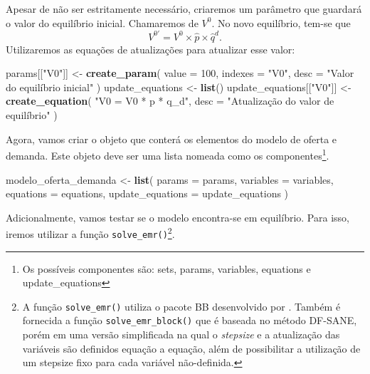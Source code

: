 \documentclass[12pt,twoside]{article}
\newenvironment{Shaded}{\begin{snugshade}}{\end{snugshade}}
\newcommand{\DataTypeTok}[1]{\textcolor[rgb]{0.13,0.29,0.53}{#1}}
\newcommand{\DecValTok}[1]{\textcolor[rgb]{0.00,0.00,0.81}{#1}}
\newcommand{\KeywordTok}[1]{\textcolor[rgb]{0.13,0.29,0.53}{\textbf{#1}}}
\newcommand{\NormalTok}[1]{#1}
\newcommand{\StringTok}[1]{\textcolor[rgb]{0.31,0.60,0.02}{#1}}
\let\oldShaded\Shaded
\let\endoldShaded\endShaded
\renewenvironment{Shaded}{\footnotesize\oldShaded}{\endoldShaded}
\let\rmarkdownfootnote\footnote%
\def\footnote{\protect\rmarkdownfootnote}
\begin{document}
Apesar de não ser estritamente necessário, criaremos um parâmetro que
guardará o valor do equilíbrio inicial. Chamaremos de \(V^0\). No novo
equilíbrio, tem-se que
\[V^{0\prime} = V^0 \times \hat{p} \times \hat{q}^d.\] Utilizaremos as
equações de atualizações para atualizar esse valor:

\begin{Shaded}
\begin{Highlighting}[]
\NormalTok{params[[}\StringTok{"V0"}\NormalTok{]] <-}\StringTok{ }\KeywordTok{create_param}\NormalTok{(}
  \DataTypeTok{value =} \DecValTok{100}\NormalTok{,}
  \DataTypeTok{indexes =} \StringTok{"V0"}\NormalTok{,}
  \DataTypeTok{desc =} \StringTok{"Valor do equilíbrio inicial"}
\NormalTok{)}
\NormalTok{update_equations <-}\StringTok{ }\KeywordTok{list}\NormalTok{()}
\NormalTok{update_equations[[}\StringTok{"V0"}\NormalTok{]] <-}\StringTok{ }\KeywordTok{create_equation}\NormalTok{(}
  \StringTok{"V0 = V0 * p * q_d"}\NormalTok{,}
  \DataTypeTok{desc =} \StringTok{"Atualização do valor de equilíbrio"}
\NormalTok{)}
\end{Highlighting}
\end{Shaded}

Agora, vamos criar o objeto que conterá os elementos do modelo de oferta
e demanda. Este objeto deve ser uma lista nomeada como os
componentes\footnote{Os possíveis componentes são: sets, params,
  variables, equations e update\_equations}.

\begin{Shaded}
\begin{Highlighting}[]
\NormalTok{modelo_oferta_demanda <-}\StringTok{ }\KeywordTok{list}\NormalTok{(}
  \DataTypeTok{params =}\NormalTok{ params,}
  \DataTypeTok{variables =}\NormalTok{ variables,}
  \DataTypeTok{equations =}\NormalTok{ equations,}
  \DataTypeTok{update_equations =}\NormalTok{ update_equations}
\NormalTok{)}
\end{Highlighting}
\end{Shaded}

Adicionalmente, vamos testar se o modelo encontra-se em equilíbrio. Para
isso, iremos utilizar a função \texttt{solve\_emr()}\footnote{A função
  \texttt{solve\_emr()} utiliza o pacote BB desenvolvido por
  \cite{varadhan_gilbert_2009}. Também é fornecida a função
  \texttt{solve\_emr\_block()} que é baseada no método DF-SANE, porém em
  uma versão simplificada na qual o \emph{stepsize} e a atualização das
  variáveis são definidos equação a equação, além de possibilitar a
  utilização de um stepsize fixo para cada variável não-definida.}.
\end{document}
